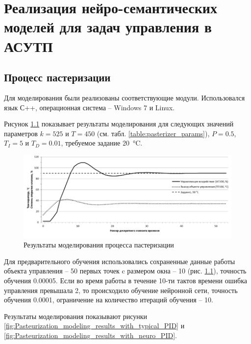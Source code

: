 \chapter{Реализация нейро-семантических моделей для задач управления в АСУТП}

\section{Процесс пастеризации}

Для моделирования были реализованы соответствующие модули. Использовался язык С++, операционная система – Windows 7 и Linux.

Рисунок \ref{fig:Pasteurization_modeling_results} показывает результаты моделирования для следующих значений параметров $k = 525$ и $T = 450$ (см. табл. \ref{table:pasterizer_params}), $P = 0.5$, $T_I = 5$ и $T_D = 0.01$, требуемое задание \SI{20}{\celsius}.

\begin{figure}[H]
    \centering
    \includegraphics[width=\textwidth]{images/chapter_4/Pasteurization_modeling_results.png}
    \caption{Результаты моделирования процесса пастеризации}
    \label{fig:Pasteurization_modeling_results}
\end{figure}

Для предварительного обучения использовались сохраненные данные работы объекта управления – 50 первых точек c размером окна – 10 (рис. \ref{fig:Pasteurization_modeling_results}), точность обучения 0.00005. Если во время работы в течение 10-ти тактов времени ошибка управления превышала 2, то происходило обучение нейронной сети, точность обучения 0.0001, ограничение на количество итераций обучения – 10.

Результаты моделирования показывают рисунки \ref{fig:Pasteurization_modeling_results_with_typical_PID} и \ref{fig:Pasteurization_modeling_results_with_neuro_PID}.

